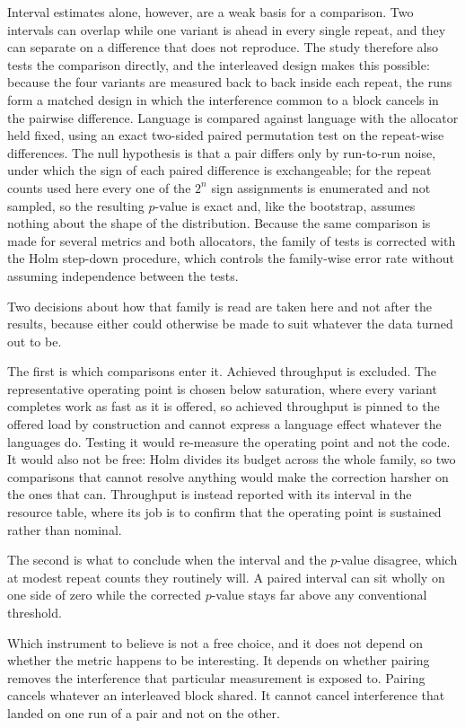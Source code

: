 \documentclass[english,twoside,openright,a4paper,censored,csm,software-track-2020]{HYthesisML}
\begin{document}
Interval estimates alone, however, are a weak basis for a comparison. Two intervals can overlap
while one variant is ahead in every single repeat, and they can separate on a difference that
does not reproduce. The study therefore also tests the comparison directly, and the interleaved
design makes this possible: because the four variants are measured back to back inside
each repeat, the runs form a matched design in which the interference common to a block cancels
in the pairwise difference. Language is compared against language with the allocator held
fixed, using an exact two-sided paired permutation test on the repeat-wise differences. The
null hypothesis is that a pair differs only by run-to-run noise, under which the sign of each
paired difference is exchangeable; for the repeat counts used here every one of the $2^{n}$
sign assignments is enumerated and not sampled, so the resulting $p$-value is exact and,
like the bootstrap, assumes nothing about the shape of the distribution. Because the same
comparison is made for several metrics and both allocators, the family of tests is corrected
with the Holm step-down procedure, which controls the family-wise error rate without assuming
independence between the tests.

Two decisions about how that family is read are taken here and not after the results,
because either could otherwise be made to suit whatever the data turned out to be.

The first is which comparisons enter it. Achieved throughput is excluded. The representative
operating point is chosen below saturation, where every variant completes work as fast as it is
offered, so achieved throughput is pinned to the offered load by construction and cannot express
a language effect whatever the languages do. Testing it would re-measure the operating point
and not the code. It would also not be free: Holm divides its budget across the whole
family, so two comparisons that cannot resolve anything would make the correction harsher on the
ones that can. Throughput is instead reported with its interval in the resource table, where its
job is to confirm that the operating point is sustained rather than nominal.

The second is what to conclude when the interval and the $p$-value disagree, which at modest
repeat counts they routinely will. A paired interval can sit wholly on one side of zero while the
corrected $p$-value stays far above any conventional threshold.

Which instrument to believe is not a free choice, and it does not depend on whether the metric
happens to be interesting. It depends on whether pairing removes the interference that particular
measurement is exposed to. Pairing cancels whatever an interleaved block shared. It cannot cancel
interference that landed on one run of a pair and not on the other.
\end{document}
